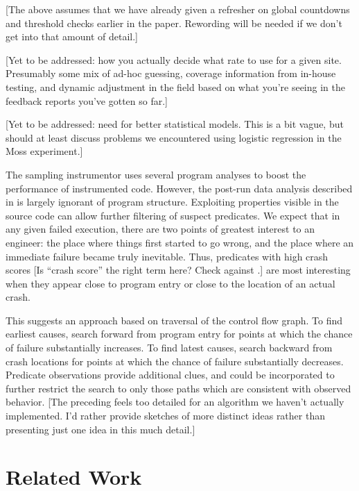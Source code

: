 \documentclass{sig-alternate}
\newcommand{\placeholder}[1]{{\color[cmyk]{0,0.61,0.87,0}[#1]}}
\begin{document}
\placeholder{The above assumes that we have already given a refresher
  on global countdowns and threshold checks earlier in the paper.
  Rewording will be needed if we don't get into that amount of
  detail.}

\placeholder{Yet to be addressed: how you actually decide what rate to
  use for a given site.  Presumably some mix of ad-hoc guessing,
  coverage information from in-house testing, and dynamic adjustment
  in the field based on what you're seeing in the feedback reports
  you've gotten so far.}

\placeholder{Yet to be addressed: need for better statistical models.
  This is a bit vague, but should at least discuss problems we
  encountered using logistic regression in the Moss experiment.}

The sampling instrumentor uses several program analyses to boost the
performance of instrumented code.  However, the post-run data analysis
described in  is largely ignorant of program
structure.  Exploiting properties visible in the source code can allow
further filtering of suspect predicates.  We expect that in any given
failed execution, there are two points of greatest interest to an
engineer: the place where things first started to go wrong, and the
place where an immediate failure became truly inevitable.  Thus,
predicates with high crash scores \placeholder{Is ``crash score'' the
  right term here?  Check against \Autoref{sec:algorithm}.} are most
interesting when they appear close to program entry or close to the
location of an actual crash.

This suggests an approach based on traversal of the control flow
graph.  To find earliest causes, search forward from program entry for
points at which the chance of failure substantially increases.  To
find latest causes, search backward from crash locations for points at
which the chance of failure substantially decreases.  Predicate
observations provide additional clues, and could be incorporated to
further restrict the search to only those paths which are consistent
with observed behavior.  \placeholder{The preceding feels too detailed
  for an algorithm we haven't actually implemented.  I'd rather
  provide sketches of more distinct ideas rather than presenting just
  one idea in this much detail.}

\section{Related Work}
\label{sec:related-work}
\end{document}
